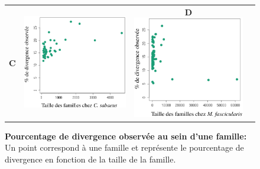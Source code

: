 \documentclass[12pt,a4paper]{article}
\begin{document}
\begin{figure}
\begin{tabular}{cccc}
		\textbf{C} & \includegraphics[scale=0.3]{img/similarity_sabaeus.png} & \textbf{D} \includegraphics[scale=0.3]{img/similarity_fascicularis.png} \\
	\end{tabular}
	\caption{\textbf{Pourcentage de divergence observée au sein d'une famille:}
	Un point correspond à une famille et représente le pourcentage de divergence en fonction de la taille de la famille.
	\label{fig:motif}
		} 
\end{figure}				
\end{document}
